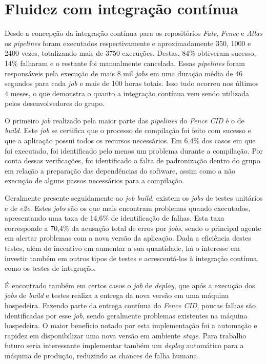 \hypertarget{fence-cid-resultados}{%
\section{Fluidez com integração contínua}\label{fence-cid-resultados}}

Desde a concepção da integração contínua para os repositórios \emph{Fate}, \emph{Fence} e \emph{Atlas} os \emph{pipelines} foram executados respectivamente e aproximadamente 350, 1000 e 2400 vezes, totalizando mais de 3750 execuções. Destas, 84\% obtiveram sucesso, 14\% falharam e o restante foi manualmente cancelada. Essas \emph{pipelines} foram responsáveis pela execução de mais 8 mil \emph{jobs} em uma duração média de 46 segundos para cada \emph{job} e mais de 100 horas totais. Isso tudo ocorreu nos últimos 4 meses, o que demonstra o quanto a integração contínua vem sendo utilizada pelos desenvolvedores do grupo.

O primeiro \emph{job} realizado pela maior parte das \emph{pipelines} do \emph{Fence CID} é o de \emph{build}. Este \emph{job} se certifica que o processo de compilação foi feito com sucesso e que a aplicação possui todos os recursos necessários. Em 6,4\% dos casos em que foi executado, foi identificado pelo menos um problema durante a compilação. Por conta dessas verificações, foi identificado a falta de padronização dentro do grupo em relação a preparação das dependências do software, assim como a não execução de alguns passos necessários para a compilação.

Geralmente presente seguidamente ao \emph{job} \emph{build}, existem os \emph{jobs} de testes unitários e de \emph{e2e}. Estes \emph{jobs} são os que mais encontram problemas quando executados, apresentando uma taxa de 14,6\% de identificação de falhas. Esta taxa corresponde a 70,4\% da acusação total de erros por \emph{jobs}, sendo o principal agente em alertar problemas com a nova versão da aplicação. Dada a eficiência destes testes, além do incentivo em aumentar a sua quantidade, há o interesse em investir também em outros tipos de testes e acrescentá-los à integração contínua, como os testes de integração.

É encontrado também em certos casos o \emph{job} de \emph{deploy}, que após a execução dos \emph{jobs} de \emph{build} e testes realiza a entrega da nova versão em uma máquina hospedeira. Fazendo parte da entrega contínua do \emph{Fence CID}, poucas falhas são identificadas por esse \emph{job}, sendo geralmente problemas existentes na máquina hospedeira. O maior benefício notado por esta implementação foi a automação e rapidez em disponibilizar uma nova versão em ambiente \emph{stage}. Para trabalho futuro seria interessante implementar também um \emph{deploy} automático para a máquina de produção, reduzindo as chances de falha humana.

